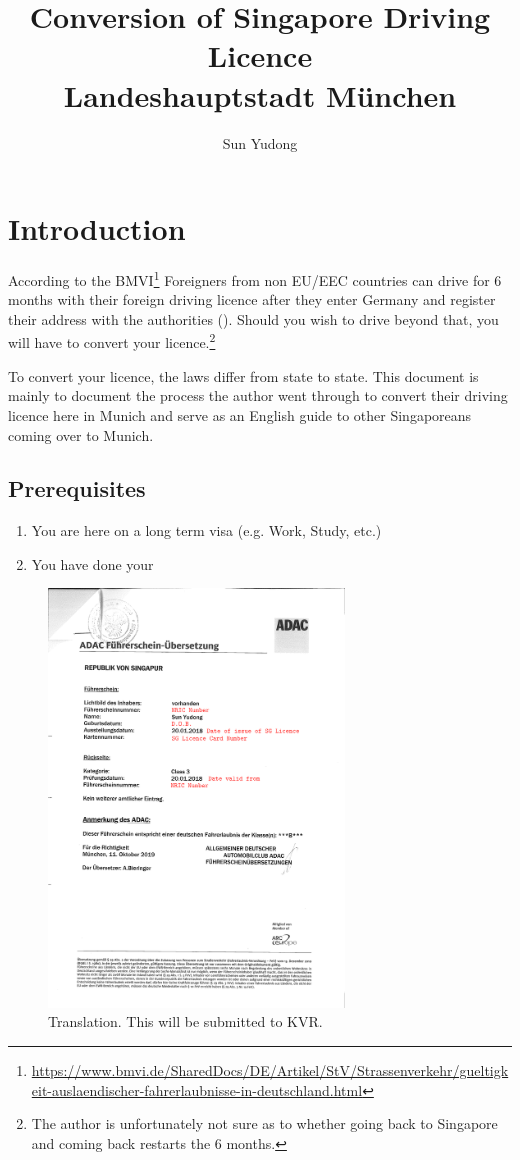 \documentclass{article}
\title{Conversion of Singapore Driving Licence \\ {\large Landeshauptstadt München}}
\author{Sun Yudong}
\date{\datum}
\begin{document}
\maketitle

\section{Introduction}
According to the BMVI\footnote{\url{https://www.bmvi.de/SharedDocs/DE/Artikel/StV/Strassenverkehr/gueltigkeit-auslaendischer-fahrerlaubnisse-in-deutschland.html}} Foreigners from non EU/EEC countries can drive for 6 months with their foreign driving licence after they enter Germany and register their address with the authorities (). Should you wish to drive beyond that, you will have to convert your licence.\footnote{The author is unfortunately not sure as to whether going back to Singapore and coming back restarts the 6 months.}

To convert your licence, the laws differ from state to state. This document is mainly to document the process the author went through to convert their driving licence here in Munich and serve as an English guide to other Singaporeans coming over to Munich. 

\subsection{Prerequisites}
\begin{enumerate}
    \item You are here on a long term visa (e.g. Work, Study, etc.)
    \item You have done your 
\end{enumerate}

\begin{figure}[H]
    \centering
    \includegraphics[width=0.7\textwidth]{ADAC.pdf}
    \caption{Translation. This will be submitted to KVR.}
    \label{fig:ADAC Translation}
\end{figure}
\end{document}
